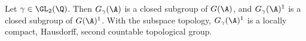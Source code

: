 Let $\gamma\in\GL_2(\Q)$. Then $G_\gamma(\A)$ is a closed subgroup of $G(\A)$, and $G_\gamma(\A)^1$ is a closed subgroup of
$G(\A)^1$. With the subspace topology, $G_\gamma(\A)^1$ is a locally compact, Hausdorff, second countable topological group.
